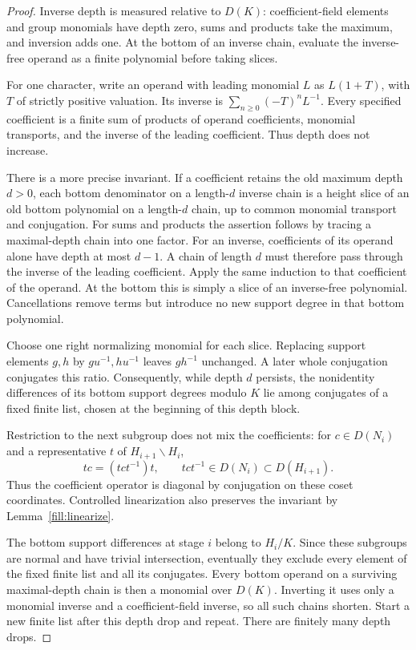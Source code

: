 \begin{proof}
Inverse depth is measured relative to \(D(K)\): coefficient-field
elements and group monomials have depth zero, sums and products
take the maximum, and inversion adds one.  At the bottom of an
inverse chain, evaluate the inverse-free operand as a finite
polynomial before taking slices.

For one character, write an operand with leading monomial \(L\) as
\(L(1+T)\), with \(T\) of strictly positive valuation.  Its inverse
is \(\sum_{n\ge0}(-T)^nL^{-1}\).  Every specified coefficient is a
finite sum of products of operand coefficients, monomial transports,
and the inverse of the leading coefficient.  Thus depth does not
increase.

There is a more precise invariant.  If a coefficient retains the
old maximum depth \(d>0\), each bottom denominator on a length-\(d\)
inverse chain is a height slice of an old bottom polynomial on a
length-\(d\) chain, up to common monomial transport and conjugation.
For sums and products the assertion follows by tracing a
maximal-depth chain into one factor.  For an inverse, coefficients
of its operand alone have depth at most \(d-1\).  A chain of length
\(d\) must therefore pass through the inverse of the leading
coefficient.  Apply the same induction to that coefficient of the
operand.  At the bottom this is simply a slice of an inverse-free
polynomial.  Cancellations remove terms but introduce no new support
degree in that bottom polynomial.

Choose one right normalizing monomial for each slice.  Replacing
support elements \(g,h\) by \(gu^{-1},hu^{-1}\) leaves \(gh^{-1}\)
unchanged.  A later whole conjugation conjugates this ratio.
Consequently, while depth \(d\) persists, the nonidentity differences
of its bottom support degrees modulo \(K\) lie among conjugates of
a fixed finite list, chosen at the beginning of this depth block.

Restriction to the next subgroup does not mix the coefficients:
for \(c\in D(N_i)\) and a representative \(t\) of
\(H_{i+1}\backslash H_i\),
\begin{equation}
 t c=(tct^{-1})t,\qquad tct^{-1}\in D(N_i)\subset D(H_{i+1}).
 \label{fill:diagonal}
\end{equation}
Thus the coefficient operator is diagonal by conjugation on these
coset coordinates.  Controlled linearization also preserves the
invariant by Lemma~\ref{fill:linearize}.

The bottom support differences at stage \(i\) belong to \(H_i/K\).
Since these subgroups are normal and have trivial intersection,
eventually they exclude every element of the fixed finite list and
all its conjugates.  Every bottom operand on a surviving maximal-depth
chain is then a monomial over \(D(K)\).  Inverting it uses only a
monomial inverse and a coefficient-field inverse, so all such chains
shorten.  Start a new finite list after this depth drop and repeat.
There are finitely many depth drops.


\end{proof}
